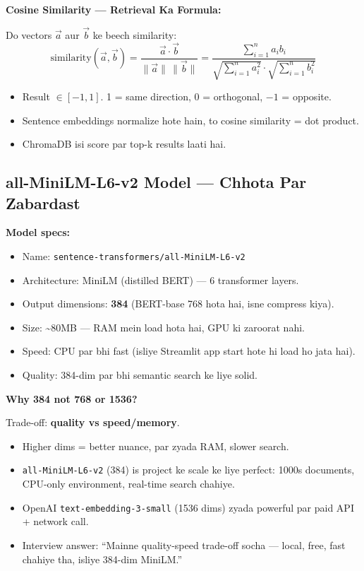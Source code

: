 \begin{mathbox}
\textbf{Cosine Similarity --- Retrieval Ka Formula:}

Do vectors $\vec{a}$ aur $\vec{b}$ ke beech similarity:
\[
\text{similarity}(\vec{a}, \vec{b}) = \frac{\vec{a} \cdot \vec{b}}{\|\vec{a}\| \, \|\vec{b}\|} = \frac{\sum_{i=1}^{n} a_i b_i}{\sqrt{\sum_{i=1}^{n} a_i^2} \cdot \sqrt{\sum_{i=1}^{n} b_i^2}}
\]

\begin{itemize}
\item Result $\in [-1, 1]$. 1 = same direction, 0 = orthogonal, $-1$ = opposite.
\item Sentence embeddings normalize hote hain, to cosine similarity = dot product.
\item ChromaDB isi score par top-k results laati hai.
\end{itemize}
\end{mathbox}

\subsection{all-MiniLM-L6-v2 Model --- Chhota Par Zabardast}

\begin{conceptbox}
\textbf{Model specs:}
\begin{itemize}
\item Name: \texttt{sentence-transformers/all-MiniLM-L6-v2}
\item Architecture: MiniLM (distilled BERT) --- 6 transformer layers.
\item Output dimensions: \textbf{384} (BERT-base 768 hota hai, isne compress kiya).
\item Size: \textasciitilde80MB --- RAM mein load hota hai, GPU ki zaroorat nahi.
\item Speed: CPU par bhi fast (isliye Streamlit app start hote hi load ho jata hai).
\item Quality: 384-dim par bhi semantic search ke liye solid.
\end{itemize}
\end{conceptbox}

\begin{memorybox}
\textbf{Why 384 not 768 or 1536?}

Trade-off: \textbf{quality vs speed/memory}.
\begin{itemize}
\item Higher dims = better nuance, par zyada RAM, slower search.
\item \texttt{all-MiniLM-L6-v2} (384) is project ke scale ke liye perfect: 1000s documents, CPU-only environment, real-time search chahiye.
\item OpenAI \texttt{text-embedding-3-small} (1536 dims) zyada powerful par paid API + network call.
\item Interview answer: ``Mainne quality-speed trade-off socha --- local, free, fast chahiye tha, isliye 384-dim MiniLM.'' 
\end{itemize}
\end{memorybox}

